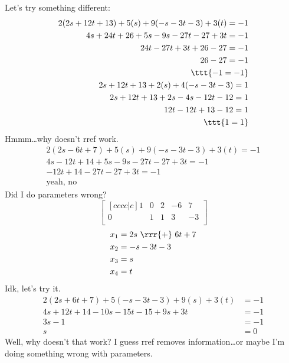 \documentclass[basic]{inVerba-notes}
\begin{document}
\begin{enumerate}
Let's try something different:
\begin{align*}
  2(2s + 12t + 13) + 5(s) + 9(-s -3t -3) + 3(t) = -1 \\
  4s + 24t + 26 + 5s - 9s - 27t - 27 + 3t = -1 \\
  24t - 27t+ 3t + 26 -27  = - 1 \\ 
  26 - 27 = -1 \\
  \ttt{-1 = -1} \\
  2s + 12t + 13 + 2(s) + 4(-s -3t - 3) = 1 \\
  2s + 12t + 13 + 2s - 4s -12t - 12 = 1 \\
  12t - 12t + 13 - 12 = 1 \\
  \ttt{1 = 1}
\end{align*}
Hmmm\dots why doesn't rref work.
\begin{align*}
  2(2s - 6t + 7) + 5(s) + 9 (-s -3t -3) + 3(t) = - 1 \\
  4s - 12t + 14 + 5s - 9s - 27t - 27 + 3t = - 1 \\
  -12t + 14 - 27t -27 + 3t = -1 \\
  \text{yeah, no}  
\end{align*}
Did I do parameters wrong?
\[%
\begin{bmatrix}[cccc|c]
  1 & 0 & 2 & -6 & 7 \\
  0 & 1 & 1 & 3 & -3 \\
\end{bmatrix}
\]%
\begin{align*}
  x_1 &= 2s~\rrr{+}~6t + 7 \\
  x_2 &= -s -3t - 3 \\
  x_3 &= s \\
  x_4 &= t
\end{align*}
Idk, let's try it.
\begin{align*}
  2(2s + 6t + 7) + 5(-s -3t -3) + 9(s) + 3(t) &= -1 \\
  4s + 12t + 14 -10s -15t - 15 + 9s + 3t &= -1 \\
  3s - 1 &= -1 \\ 
  s &= 0
\end{align*}
Well, why doesn't that work? I guess rref removes information\dots or maybe I'm doing something wrong with parameters.
\end{enumerate}
\end{document}
